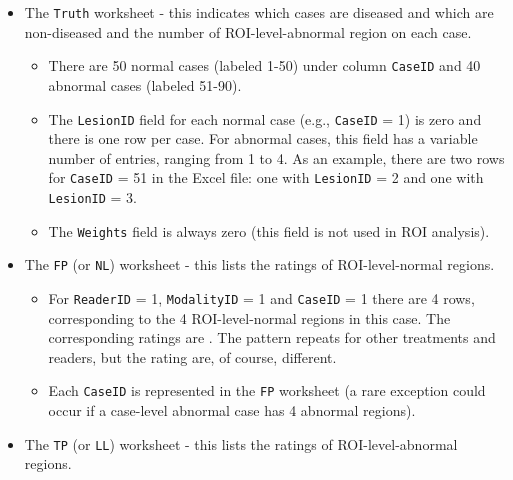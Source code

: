 \documentclass[]{book}
\providecommand{\tightlist}{%
  \setlength{\itemsep}{0pt}\setlength{\parskip}{0pt}}
\begin{document}
\begin{itemize}
\tightlist
\item
  The \texttt{Truth} worksheet - this indicates which cases are diseased and which are non-diseased and the number of ROI-level-abnormal region on each case.

  \begin{itemize}
  \tightlist
  \item
    There are 50 normal cases (labeled 1-50) under column \texttt{CaseID} and 40 abnormal cases (labeled 51-90).\\
  \item
    The \texttt{LesionID} field for each normal case (e.g., \texttt{CaseID} = 1) is zero and there is one row per case. For abnormal cases, this field has a variable number of entries, ranging from 1 to 4. As an example, there are two rows for \texttt{CaseID} = 51 in the Excel file: one with \texttt{LesionID} = 2 and one with \texttt{LesionID} = 3.\\
  \item
    The \texttt{Weights} field is always zero (this field is not used in ROI analysis).
  \end{itemize}
\item
  The \texttt{FP} (or \texttt{NL}) worksheet - this lists the ratings of ROI-level-normal regions.

  \begin{itemize}
  \tightlist
  \item
    For \texttt{ReaderID} = 1, \texttt{ModalityID} = 1 and \texttt{CaseID} = 1 there are 4 rows, corresponding to the 4 ROI-level-normal regions in this case. The corresponding ratings are . The pattern repeats for other treatments and readers, but the rating are, of course, different.\\
  \item
    Each \texttt{CaseID} is represented in the \texttt{FP} worksheet (a rare exception could occur if a case-level abnormal case has 4 abnormal regions).
  \end{itemize}
\item
  The \texttt{TP} (or \texttt{LL}) worksheet - this lists the ratings of ROI-level-abnormal regions.


\end{itemize}
\end{document}
